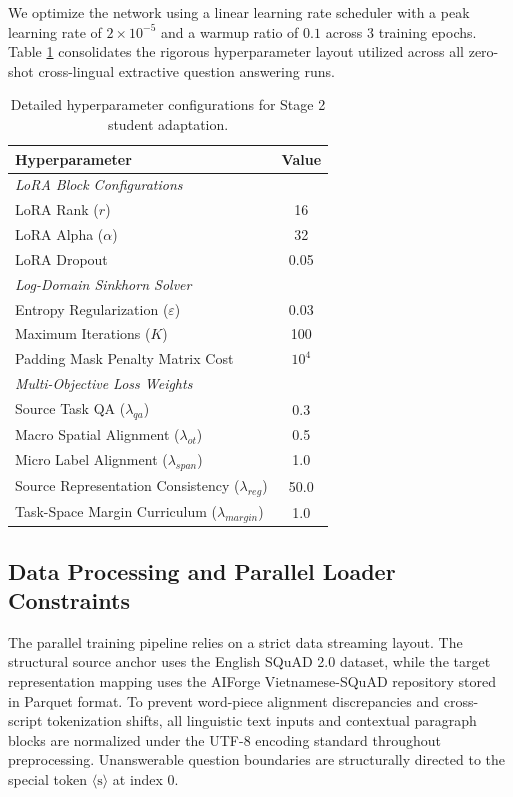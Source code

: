 \documentclass[11pt]{article}
\begin{document}
We optimize the network using a linear learning rate scheduler with a peak learning rate of $2\times 10^{-5}$ and a warmup ratio of $0.1$ across 3 training epochs. Table \ref{tab:hyperparameters} consolidates the rigorous hyperparameter layout utilized across all zero-shot cross-lingual extractive question answering runs.

\begin{table}[H]
\centering
\small
\begin{tabular}{lc}
\toprule
\textbf{Hyperparameter} & \textbf{Value} \\
\midrule
\multicolumn{2}{l}{\textit{LoRA Block Configurations}} \\
LoRA Rank ($r$) & 16 \\
LoRA Alpha ($\alpha$) & 32 \\
LoRA Dropout & 0.05 \\
\midrule
\multicolumn{2}{l}{\textit{Log-Domain Sinkhorn Solver}} \\
Entropy Regularization ($\varepsilon$) & 0.03 \\
Maximum Iterations ($K$) & 100 \\
Padding Mask Penalty Matrix Cost & $10^4$ \\
\midrule
\multicolumn{2}{l}{\textit{Multi-Objective Loss Weights}} \\
Source Task QA ($\lambda_{qa}$) & 0.3 \\
Macro Spatial Alignment ($\lambda_{ot}$) & 0.5 \\
Micro Label Alignment ($\lambda_{span}$) & 1.0 \\
Source Representation Consistency ($\lambda_{reg}$) & 50.0 \\
Task-Space Margin Curriculum ($\lambda_{margin}$) & 1.0 \\
\bottomrule
\end{tabular}
\caption{Detailed hyperparameter configurations for Stage 2 student adaptation.}
\label{tab:hyperparameters}
\end{table}

\subsection{Data Processing and Parallel Loader Constraints}
The parallel training pipeline relies on a strict data streaming layout. The structural source anchor uses the English SQuAD 2.0 dataset, while the target representation mapping uses the AIForge Vietnamese-SQuAD repository stored in Parquet format. To prevent word-piece alignment discrepancies and cross-script tokenization shifts, all linguistic text inputs and contextual paragraph blocks are normalized under the UTF-8 encoding standard throughout preprocessing. Unanswerable question boundaries are structurally directed to the special token $\langle\text{s}\rangle$ at index 0.
\end{document}
